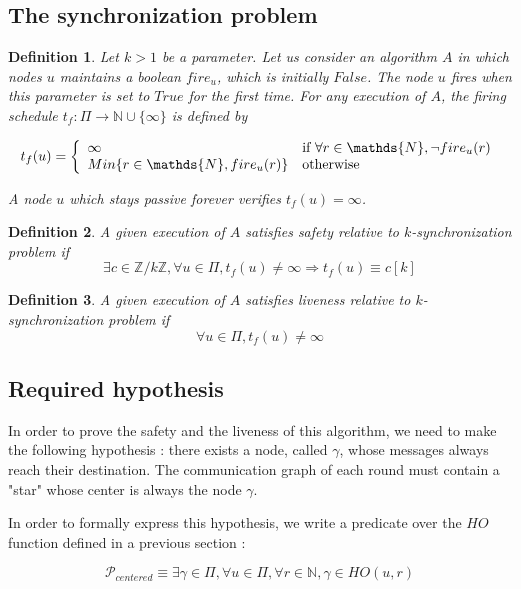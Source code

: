 \documentclass{article}
\newtheorem{definition}{Definition}
\newcommand{\cent}{\gamma}
\newcommand{\tf}{t_{f}}
\begin{document}
\subsection{The synchronization problem}

\begin{definition}
	Let $k > 1$ be a parameter. Let us consider an algorithm $A$ in which nodes $u$ maintains a boolean $fire_u$, which is initially $False$.
	The node $u$ fires when this parameter is set to $True$ for the first time.
	For any execution of $A$, the firing schedule $\tf : \Pi \rightarrow \mathds{N} \cup \{\infty\}$ is defined by 

	$$\tf(u) = \left \{
	\begin{array}{l l}
		\infty & \mbox{if}~\forall r \in \mathds{N}, \neg fire_u(r) \\
		Min \{r \in \mathds{N}, fire_u(r)\} & \mbox{otherwise}
	\end{array} \right.$$

	 A node $u$ which stays passive forever verifies $\tf(u) = \infty$.
\end{definition}

\begin{definition}
	A given execution of $A$ satisfies safety relative to $k$-synchronization problem if
	$$\exists c \in \mathds{Z}/k\mathds{Z}, \forall u \in \Pi,
	\tf(u) \neq \infty \Rightarrow \tf(u) \equiv c[k]$$
\end{definition}

\begin{definition}
	A given execution of $A$ satisfies liveness relative to $k$-synchronization problem if
	$$\forall u \in \Pi, \tf(u) \neq \infty$$
\end{definition}

\subsection{Required hypothesis}

In order to prove the safety and the liveness of this algorithm, we need to make the following hypothesis :
there exists a node, called $\cent$, whose messages always reach their destination.
The communication graph of each round must contain a "star" whose center is always the node $\cent$.

In order to formally express this hypothesis, we write a predicate over the $HO$ function defined in a previous section :

$$\mathcal{P}_{centered} \equiv \exists \cent \in \Pi, \forall u \in \Pi, \forall r \in \mathds{N}, \cent \in HO(u,r)$$
\end{document}
